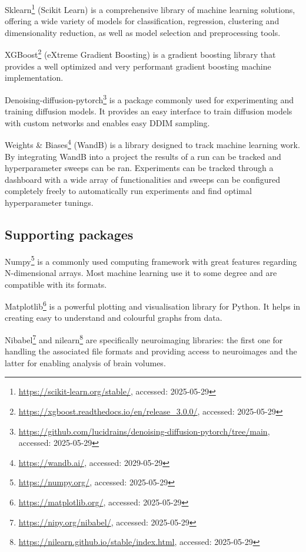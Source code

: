 	Sklearn\footnote{\url{https://scikit-learn.org/stable/}, accessed: 2025-05-29} (Scikit Learn) is a comprehensive library of machine learning solutions, offering a wide variety of models for classification, regression, clustering and dimensionality reduction, as well as model selection and preprocessing tools.
	
	XGBoost\footnote{\url{https://xgboost.readthedocs.io/en/release_3.0.0/}, accessed: 2025-05-29} (eXtreme Gradient Boosting) is a gradient boosting library that provides a well optimized and very performant gradient boosting machine implementation.
	
	Denoising-diffusion-pytorch\footnote{\url{https://github.com/lucidrains/denoising-diffusion-pytorch/tree/main}, accessed: 2025-05-29} is a package commonly used for experimenting and training diffusion models. It provides an easy interface to train diffusion models with custom networks and enables easy DDIM sampling.
	
	Weights \& Biases\footnote{\url{https://wandb.ai/}, accessed: 2029-05-29} (WandB) is a library designed to track machine learning work. By integrating WandB into a project the results of a run can be tracked and hyperparameter sweeps can be ran. Experiments can be tracked through a dashboard with a wide array of functionalities and sweeps can be configured completely freely to automatically run experiments and find optimal hyperparameter tunings.
	
	
	\subsection{Supporting packages}
	Numpy\footnote{\url{https://numpy.org/}, accessed: 2025-05-29} is a commonly used computing framework with great features regarding N-dimensional arrays. Most machine learning use it to some degree and are compatible with its formats.
	
	Matplotlib\footnote{\url{https://matplotlib.org/}, accessed: 2025-05-29} is a powerful plotting and visualisation library for Python. It helps in creating easy to understand and colourful graphs from data.
	
	Nibabel\footnote{\url{https://nipy.org/nibabel/}, accessed: 2025-05-29} and nilearn\footnote{\url{https://nilearn.github.io/stable/index.html}, accessed: 2025-05-29} are specifically neuroimaging libraries: the first one for handling the associated file formats and providing access to neuroimages and the latter for enabling analysis of brain volumes.
	

